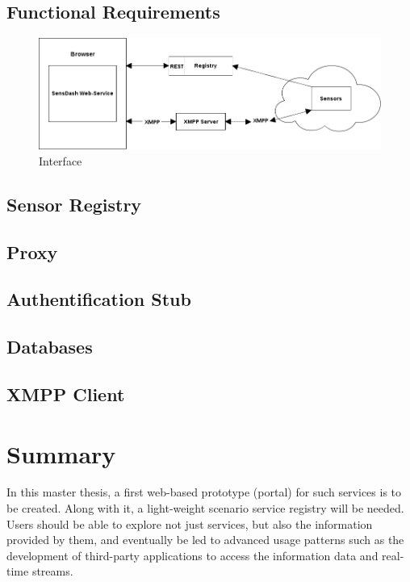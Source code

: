 \subsection{Functional Requirements}
\begin{figure}[!ht]
\centering
\includegraphics[scale=0.5]{images/Interface.png}   
\caption[Interface]{Interface}
\label{img:interfaces}                           
\end{figure}

\subsection{Sensor Registry}
\subsection{Proxy}
\subsection{Authentification Stub}
\subsection{Databases}
\subsection{XMPP Client}

\section{Summary}
In this master thesis, a first web-based prototype (portal) for such services is to be
created. Along with it, a light-weight scenario service registry will be needed. Users
should be able to explore not just services, but also the information provided by
them, and eventually be led to advanced usage patterns such as the development
of third-party applications to access the information data and real-time streams.